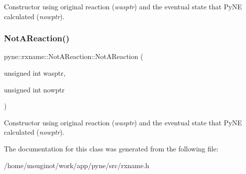 Constructor using original reaction ({\itshape wasptr}) and the eventual state that Py\+NE calculated ({\itshape nowptr}). \mbox{\label{classpyne_1_1rxname_1_1_not_a_reaction_a7e0b63801e38b5d2c59edd635817fb80}} 
\subsubsection{\texorpdfstring{Not\+A\+Reaction()}{NotAReaction()}\hspace{0.1cm}{\footnotesize\ttfamily [7/7]}}
{\footnotesize\ttfamily pyne\+::rxname\+::\+Not\+A\+Reaction\+::\+Not\+A\+Reaction (\begin{DoxyParamCaption}\item[{unsigned int}]{wasptr,  }\item[{unsigned int}]{nowptr }\end{DoxyParamCaption})\hspace{0.3cm}{\ttfamily [inline]}}

Constructor using original reaction ({\itshape wasptr}) and the eventual state that Py\+NE calculated ({\itshape nowptr}). 

The documentation for this class was generated from the following file\+:\begin{DoxyCompactItemize}
\item 
/home/mouginot/work/app/pyne/src/rxname.\+h\end{DoxyCompactItemize}
